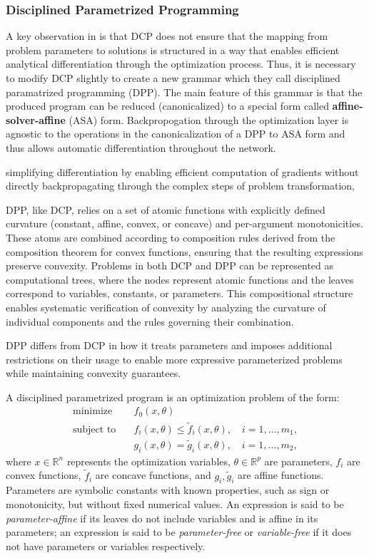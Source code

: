 \documentclass{article}
\begin{document}
\subsubsection{Disciplined Parametrized Programming}

A key observation in \citet{differentiableconvexoptimizationlayers} is that DCP does not ensure that the mapping from problem parameters to solutions is structured in a way that enables efficient analytical differentiation through the optimization process. Thus, it is necessary to modify DCP slightly to create a new grammar which they call disciplined paramatrized programming (DPP). The main feature of this grammar is that the produced program can be reduced (canonicalized) to a special form called \textbf{affine-solver-affine} (ASA) form. Backpropogation through the optimization layer is agnostic to the operations in the canonicalization of a DPP to ASA form and thus allows automatic differentiation throughout the network. 

simplifying differentiation by enabling efficient computation of gradients without directly backpropagating through the complex steps of problem transformation,

DPP, like DCP, relies on a set of atomic functions with explicitly defined curvature (constant, affine, convex, or concave) and per-argument monotonicities. These atoms are combined according to composition rules derived from the composition theorem for convex functions, ensuring that the resulting expressions preserve convexity. Problems in both DCP and DPP can be represented as computational trees, where the nodes represent atomic functions and the leaves correspond to variables, constants, or parameters. This compositional structure enables systematic verification of convexity by analyzing the curvature of individual components and the rules governing their combination.

DPP differs from DCP in how it treats parameters and imposes additional restrictions on their usage to enable more expressive parameterized problems while maintaining convexity guarantees. 

A disciplined parametrized program is an optimization problem of the form:
\[
\begin{aligned}
\text{minimize} \quad & f_0(x, \theta) \\
\text{subject to} \quad & f_i(x, \theta) \leq \tilde{f}_i(x, \theta), \quad i = 1, \ldots, m_1, \\
& g_i(x, \theta) = \tilde{g}_i(x, \theta), \quad i = 1, \ldots, m_2,
\end{aligned}
\]
where \( x \in \mathbb{R}^n \) represents the optimization variables, \( \theta \in \mathbb{R}^p \) are parameters, \( f_i \) are convex functions, \( \tilde{f}_i \) are concave functions, and \( g_i, \tilde{g}_i \) are affine functions. Parameters are symbolic constants with known properties, such as sign or monotonicity, but without fixed numerical values. An expression is said to be \textit{parameter-affine} if its leaves do not include variables and is affine in its parameters; an expression is said to be \textit{parameter-free} or \textit{variable-free} if it does not have parameters or variables respectively.
\end{document}
